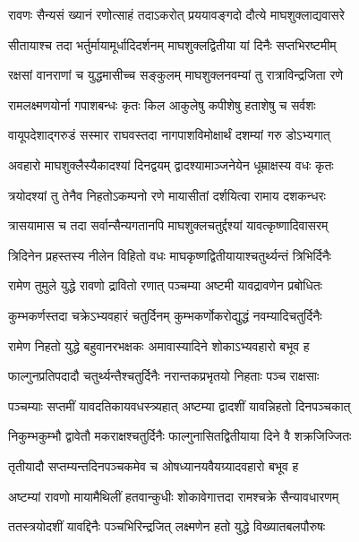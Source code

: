 \twolineshloka
{रावणः सैन्यसं ख्यानं रणोत्साहं तदाऽकरोत्}
{प्रययावङ्गदो दौत्ये माघशुक्लाद्यवासरे}%

\twolineshloka
{सीतायाश्च तदा भर्तुर्मायामूर्धादिदर्शनम्}
{माघशुक्लद्वितीया यां दिनैः सप्तभिरष्टमीम्}%

\twolineshloka
{रक्षसां वानराणां च युद्धमासीच्च सङ्कुलम्}
{माघशुक्लनवम्यां तु रात्राविन्द्रजिता रणे}%

\twolineshloka
{रामलक्ष्मणयोर्ना गपाशबन्धः कृतः किल}
{आकुलेषु कपीशेषु हताशेषु च सर्वशः}%

\twolineshloka
{वायूपदेशाद्गरुडं सस्मार राघवस्तदा}
{नागपाशविमोक्षार्थं दशम्यां गरु डोऽभ्यगात्}%

\twolineshloka
{अवहारो माघशुक्लैस्यैकादश्यां दिनद्वयम्}
{द्वादश्यामाञ्जनेयेन धूम्राक्षस्य वधः कृतः}%

\twolineshloka
{त्रयोदश्यां तु तेनैव निहतोऽकम्पनो रणे}
{मायासीतां दर्शयित्वा रामाय दशकन्धरः}%

\twolineshloka
{त्रासयामास च तदा सर्वान्सैन्यगतानपि}
{माघशुक्लचतुर्द्दश्यां यावत्कृष्णादिवासरम्}%

\twolineshloka
{त्रिदिनेन प्रहस्तस्य नीलेन विहितो वधः}
{माघकृष्णद्वितीयायाश्चतुर्थ्यन्तं त्रिभिर्दिनैः}%

\twolineshloka
{रामेण तुमुले युद्धे रावणो द्रावितो रणात्}
{पञ्चम्या अष्टमी यावद्रावणेन प्रबोधितः}%

\twolineshloka
{कुम्भकर्णस्तदा चक्रेऽभ्यवहारं चतुर्दिनम्}
{कुम्भकर्णोकरोद्युद्धं नवम्यादिचतुर्दिनैः}%

\twolineshloka
{रामेण निहतो युद्धे बहुवानरभक्षकः}
{अमावास्यादिने शोकाऽभ्यवहारो बभूव ह}%

\twolineshloka
{फाल्गुनप्रतिपदादौ चतुर्थ्यन्तैश्चतुर्दिनैः}
{नरान्तकप्रभृतयो निहताः पञ्च राक्षसाः}%

\twolineshloka
{पञ्चम्याः सप्तमीं यावदतिकायवधस्त्र्यहात्}
{अष्टम्या द्वादशीं यावन्निहतो दिनपञ्चकात्}%

\twolineshloka
{निकुम्भकुम्भौ द्वावेतौ मकराक्षश्चतुर्दिनैः}
{फाल्गुनासितद्वितीयाया दिने वै शक्रजिज्जितः}%

\twolineshloka
{तृतीयादौ सप्तम्यन्तदिनपञ्चकमेव च}
{ओषध्यानयवैयग्र्यादवहारो बभूव ह}%

\twolineshloka
{अष्टम्यां रावणो मायामैथिलीं हतवान्कुधीः}
{शोकावेगात्तदा रामश्चक्रे सैन्यावधारणम्}%

\twolineshloka
{ततस्त्रयोदशीं यावद्दिनैः पञ्चभिरिन्द्रजित्}
{लक्ष्मणेन हतो युद्धे विख्यातबलपौरुषः}%

